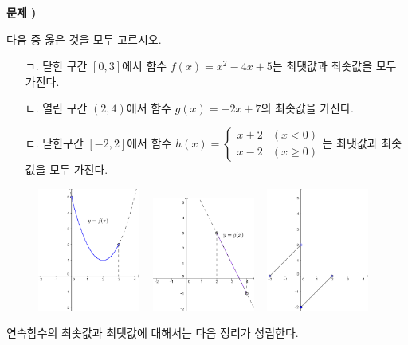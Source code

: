 \documentclass{oblivoir}
\newcounter{num}
\newcommand\prob[1]
{\bigskip\par\noindent\stepcounter{num} \textbf{문제 \thenum) #1}\par\noindent}
\begin{document}
%
\prob{}
다음 중 옳은 것을 모두 고르시오.
\begin{enumerate}
\item[ㄱ.]
닫힌 구간 \([0,3]\)에서  함수 \(f(x)=x^2-4x+5\)는 최댓값과 최솟값을 모두 가진다.
\item[ㄴ.]
열린 구간 \((2,4)\)에서 함수 \(g(x)=-2x+7\)의 최솟값을 가진다.
\item[ㄷ.]
닫힌구간 \([-2,2]\)에서 함수 \(h(x)=\begin{cases}x+2&(x<0)\\x-2&(x\ge0)\end{cases}\)는 최댓값과 최솟값을 모두 가진다.
\end{enumerate}

\begin{figure}[h!]
\centering
\noindent\includegraphics[width=0.3\textwidth]{maxmin_1}
~
\noindent\includegraphics[width=0.3\textwidth]{maxmin_2}
~
\noindent\includegraphics[width=0.3\textwidth]{maxmin_3}
\end{figure}
\bigskip

연속함수의 최솟값과 최댓값에 대해서는 다음 정리가 성립한다.
\medskip
\end{document}
